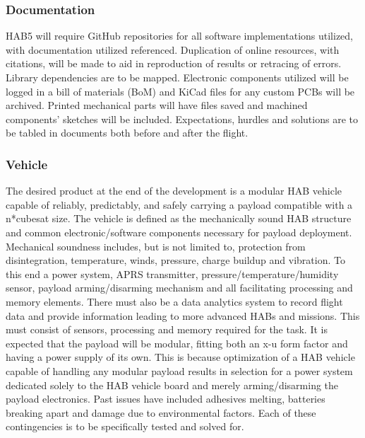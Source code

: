 \documentclass[conference]{IEEEtran} %
\begin{document}
\subsubsection{Documentation}
 HAB5 will require GitHub repositories for all software implementations utilized, with documentation utilized referenced. Duplication of online resources, with citations, will be made to aid in reproduction of results or retracing of errors. Library dependencies are to be mapped. Electronic components utilized will be logged in a bill of materials (BoM) and KiCad files for any custom PCBs will be archived. Printed mechanical parts will have files saved and machined components’ sketches will be included. Expectations, hurdles and solutions are to be tabled in documents both before and after the flight.

\subsubsection{Vehicle}
The desired product at the end of the development is a modular HAB vehicle capable of reliably, predictably, and safely carrying a payload compatible with a n*cubesat size. The vehicle is defined as the mechanically sound HAB structure and common electronic/software components necessary for payload deployment. Mechanical soundness includes, but is not limited to, protection from disintegration, temperature, winds, pressure, charge buildup and vibration. To this end a power system, APRS transmitter, pressure/temperature/humidity sensor, payload arming/disarming mechanism and all facilitating processing and memory elements. There must also be a data analytics system to record flight data and provide information leading to more advanced HABs and missions. This must consist of sensors, processing and memory required for the task.  It is expected that the payload will be modular, fitting both an x-u form factor and having a power supply of its own. This is because optimization of a HAB vehicle capable of handling any modular payload results in selection for a power system dedicated solely to the HAB vehicle board and merely arming/disarming the payload electronics. Past issues have included adhesives melting, batteries breaking apart and damage due to environmental factors. Each of these contingencies is to be specifically tested and solved for.
\end{document}
